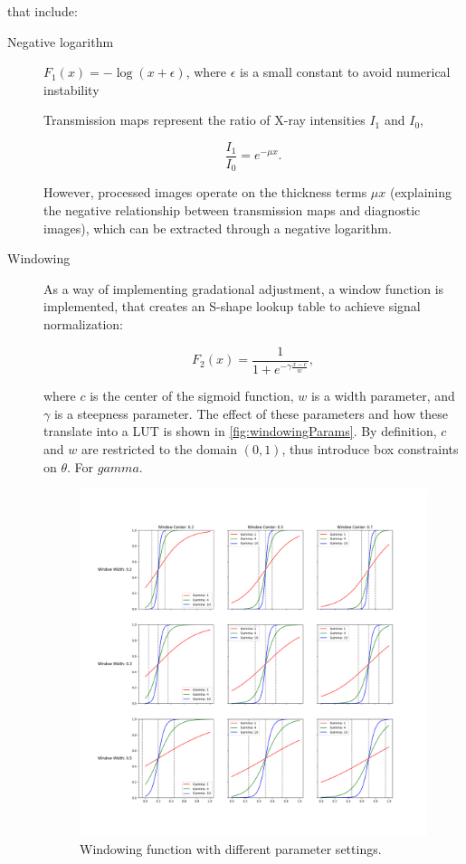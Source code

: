 \documentclass[nomenclature, english, bibtex]{kththesis}
\numberwithin{listing}{chapter}
\begin{document}
that include:
\begin{description}

\item[Negative logarithm] $F_1(x) = -\log(x + \epsilon)$, where $\epsilon$ is a small constant to avoid numerical instability

    Transmission maps represent the ratio of X-ray intensities $I_1$ and $I_0$,

    \begin{equation}
        \frac{I_1}{I_0} = e^{-\mu x}.
    \end{equation}

    However, processed images operate on the thickness terms $\mu x$
    (explaining the negative relationship between transmission maps and diagnostic images),
    which can be extracted through a negative logarithm.

\item[Windowing] As a way of implementing gradational adjustment, a window function is implemented, that creates
an S-shape lookup table to achieve signal normalization:

\begin{equation}
    F_2(x) = \frac{1}{1+e^{-\gamma \frac{x - c}{w}}},
\end{equation}

where $c$ is the center of the sigmoid function, $w$ is a width parameter, and $\gamma$ is a steepness parameter.
The effect of these parameters and how these translate into a LUT is shown in \autoref{fig:windowingParams}.
By definition, $c$ and $w$ are restricted to the domain $(0, 1)$, thus introduce box constraints on
$\theta$. For $gamma$.

\begin{figure}
    \centering
    \includegraphics[width=1.0\textwidth]{figures/window_params.png}
    \caption{Windowing function with different parameter settings.}
    \label{fig:windowingParams}
\end{figure}


\end{description}
\end{document}
